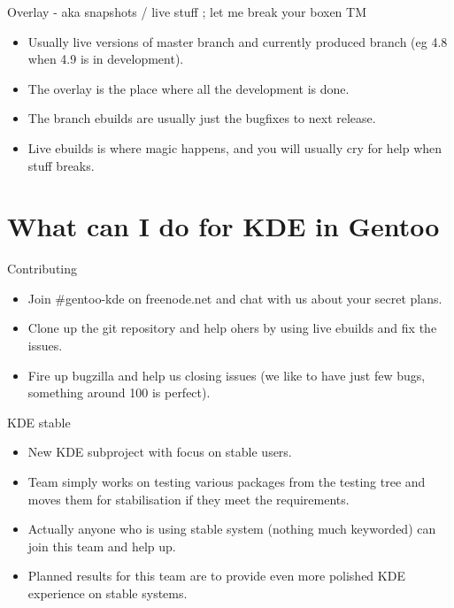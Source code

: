 \documentclass{beamer}
\begin{document}
\begin{frame}{Overlay - aka snapshots / live stuff ; let me break your boxen TM}
	\begin{itemize}
		\item Usually live versions of master branch and currently produced branch (eg 4.8 when 4.9 is in development).
		\item The overlay is the place where all the development is done.
		\item The branch ebuilds are usually just the bugfixes to next release.
		\item Live ebuilds is where magic happens, and you will usually cry for help when stuff breaks.
	\end{itemize}
\end{frame}

\section{What can I do for KDE in Gentoo}

\begin{frame}{Contributing}
	\begin{itemize}
		\item Join \#gentoo-kde on freenode.net and chat with us about your secret plans.
		\item Clone up the git repository and help ohers by using live ebuilds and fix the issues.
		\item Fire up bugzilla and help us closing issues (we like to have just few bugs, something around 100 is perfect).
	\end{itemize}
\end{frame}

\begin{frame}{KDE stable}
	\begin{itemize}
		\item New KDE subproject with focus on stable users.
		\item Team simply works on testing various packages from the testing tree and moves them for stabilisation if they meet the requirements.
		\item Actually anyone who is using stable system (nothing much keyworded) can join this team and help up.
		\item Planned results for this team are to provide even more polished KDE experience on stable systems.
	\end{itemize}
\end{frame}
\end{document}
